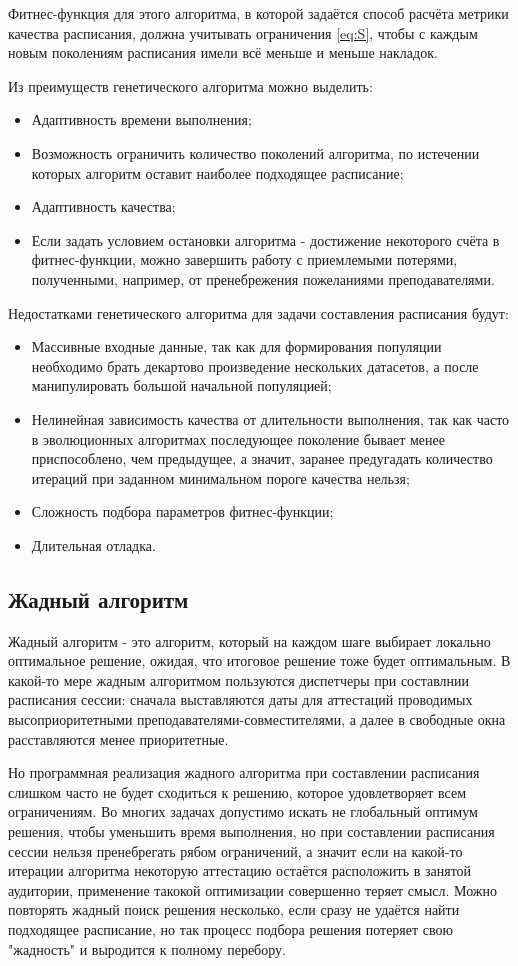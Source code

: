 Фитнес-функция для этого алгоритма, в которой задаётся способ расчёта метрики качества расписания, должна учитывать ограничения \eqref{eq:S}, чтобы с каждым новым поколениям расписания имели всё меньше и меньше накладок.

Из  преимуществ генетического алгоритма можно выделить:
\begin{itemize}
	\item Адаптивность времени выполнения;
	\item Возможность ограничить количество поколений алгоритма, по истечении которых алгоритм оставит наиболее подходящее расписание;
	\item Адаптивность качества;
	\item Если задать условием остановки алгоритма - достижение некоторого счёта в фитнес-функции, можно завершить работу с приемлемыми потерями, полученными, например, от пренебрежения пожеланиями преподавателями.
\end{itemize}

Недостатками генетического алгоритма для задачи составления расписания будут:
\begin{itemize}
	\item Массивные входные данные, так как для формирования популяции необходимо брать декартово произведение нескольких датасетов, а после манипулировать большой начальной популяцией;
	\item Нелинейная зависимость качества от длительности выполнения, так как часто в эволюционных алгоритмах последующее поколение бывает менее приспособлено, чем предыдущее, а значит, заранее предугадать количество итераций при заданном минимальном пороге качества нельзя;
	\item Сложность подбора параметров фитнес-функции;
	\item Длительная отладка.
\end{itemize}

\subsection{Жадный алгоритм}
Жадный алгоритм - это алгоритм, который на каждом шаге выбирает локально оптимальное решение, ожидая, что итоговое решение тоже будет оптимальным. В какой-то мере жадным алгоритмом пользуются диспетчеры при составлнии расписания сессии: сначала выставляются даты для аттестаций проводимых высоприоритетными преподавателями-совместителями, а далее в свободные окна расставляются менее приоритетные.

Но программная реализация жадного алгоритма при составлении расписания слишком часто не будет сходиться к решению, которое удовлетворяет всем ограничениям. Во многих задачах допустимо искать не глобальный оптимум решения, чтобы уменьшить время выполнения, но при составлении расписания сессии нельзя пренебрегать рябом ограничений, а значит если на какой-то итерации алгоритма некоторую аттестацию остаётся расположить в занятой аудитории, применение такокой оптимизации совершенно теряет смысл. Можно повторять жадный поиск решения несколько, если сразу не удаётся найти подходящее расписание, но так процесс подбора решения потеряет свою "жадность" и выродится к полному перебору.

